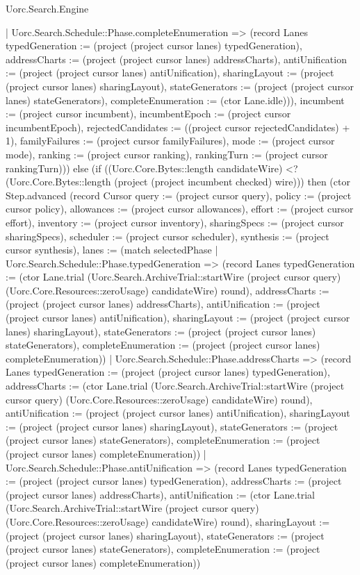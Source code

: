 \begin{lexlean}{Uorc.Search.Engine}
\begin{semanticmodule}
{{            | Uorc.Search.Schedule::Phase.completeEnumeration => (record Lanes {typedGeneration := (project (project cursor lanes) typedGeneration), addressCharts := (project (project cursor lanes) addressCharts), antiUnification := (project (project cursor lanes) antiUnification), sharingLayout := (project (project cursor lanes) sharingLayout), stateGenerators := (project (project cursor lanes) stateGenerators), completeEnumeration := (ctor Lane.idle)})), incumbent := (project cursor incumbent), incumbentEpoch := (project cursor incumbentEpoch), rejectedCandidates := ((project cursor rejectedCandidates) + 1), familyFailures := (project cursor familyFailures), mode := (project cursor mode), ranking := (project cursor ranking), rankingTurn := (project cursor rankingTurn)})) else (if ((Uorc.Core.Bytes::length candidateWire) <? (Uorc.Core.Bytes::length (project (project incumbent checked) wire))) then (ctor Step.advanced (record Cursor {query := (project cursor query), policy := (project cursor policy), allowances := (project cursor allowances), effort := (project cursor effort), inventory := (project cursor inventory), sharingSpecs := (project cursor sharingSpecs), scheduler := (project cursor scheduler), synthesis := (project cursor synthesis), lanes := (match selectedPhase
            | Uorc.Search.Schedule::Phase.typedGeneration => (record Lanes {typedGeneration := (ctor Lane.trial (Uorc.Search.ArchiveTrial::startWire (project cursor query) (Uorc.Core.Resources::zeroUsage) candidateWire) round), addressCharts := (project (project cursor lanes) addressCharts), antiUnification := (project (project cursor lanes) antiUnification), sharingLayout := (project (project cursor lanes) sharingLayout), stateGenerators := (project (project cursor lanes) stateGenerators), completeEnumeration := (project (project cursor lanes) completeEnumeration)})
            | Uorc.Search.Schedule::Phase.addressCharts => (record Lanes {typedGeneration := (project (project cursor lanes) typedGeneration), addressCharts := (ctor Lane.trial (Uorc.Search.ArchiveTrial::startWire (project cursor query) (Uorc.Core.Resources::zeroUsage) candidateWire) round), antiUnification := (project (project cursor lanes) antiUnification), sharingLayout := (project (project cursor lanes) sharingLayout), stateGenerators := (project (project cursor lanes) stateGenerators), completeEnumeration := (project (project cursor lanes) completeEnumeration)})
            | Uorc.Search.Schedule::Phase.antiUnification => (record Lanes {typedGeneration := (project (project cursor lanes) typedGeneration), addressCharts := (project (project cursor lanes) addressCharts), antiUnification := (ctor Lane.trial (Uorc.Search.ArchiveTrial::startWire (project cursor query) (Uorc.Core.Resources::zeroUsage) candidateWire) round), sharingLayout := (project (project cursor lanes) sharingLayout), stateGenerators := (project (project cursor lanes) stateGenerators), completeEnumeration := (project (project cursor lanes) completeEnumeration)})
}}
\end{semanticmodule}
\end{lexlean}
